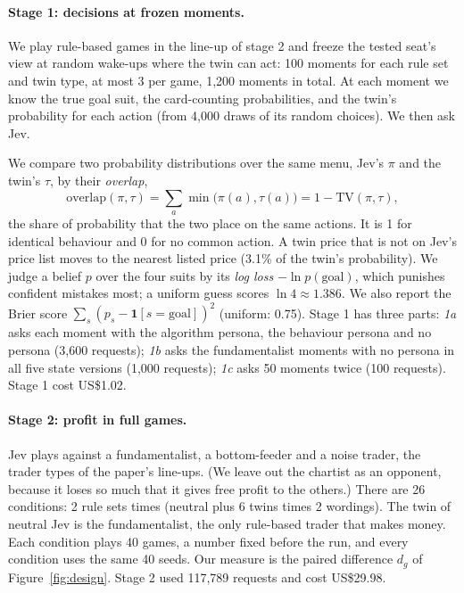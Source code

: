 \documentclass[10pt]{article}
\begin{document}
\paragraph{Stage 1: decisions at frozen moments.} We play rule-based games in the line-up of stage 2 and freeze the
tested seat's view at random wake-ups where the twin can act: 100 moments for each rule set and twin type, at most 3
per game, 1,200 moments in total. At each moment we know the true goal suit, the card-counting probabilities, and the
twin's probability for each action (from 4,000 draws of its random choices). We then ask Jev.

We compare two
probability distributions over the same menu, Jev's $\pi$ and the twin's $\tau$, by their \emph{overlap},
\[
  \mathrm{overlap}(\pi,\tau) = \sum_{a} \min\bigl(\pi(a), \tau(a)\bigr) = 1 - \mathrm{TV}(\pi,\tau),
\]
the share of probability that the two place on the same actions. It is 1 for identical behaviour and 0 for no common
action. A twin price that is not on Jev's price list moves to the nearest listed price (3.1\% of the twin's
probability). We judge a belief $p$ over the four suits by its \emph{log loss} $-\ln p(\text{goal})$, which punishes
confident mistakes most; a uniform guess scores $\ln 4 \approx 1.386$. We also report the Brier score
$\sum_s (p_s - \mathbf{1}[s = \text{goal}])^2$ (uniform: 0.75). Stage 1 has three parts: \emph{1a} asks each moment
with the algorithm persona, the behaviour persona and no persona (3,600 requests); \emph{1b} asks the fundamentalist
moments with no persona in all five state versions (1,000 requests); \emph{1c} asks 50 moments twice (100 requests).
Stage 1 cost US\$1.02.

\paragraph{Stage 2: profit in full games.} Jev plays against a fundamentalist, a bottom-feeder and a noise trader,
the trader types of the paper's line-ups. (We leave out the chartist as an opponent, because it loses so much that it
gives free profit to the others.) There are 26 conditions: 2 rule sets times (neutral plus 6 twins times 2 wordings).
The twin of neutral Jev is the fundamentalist, the only rule-based trader that makes money. Each condition plays 40
games, a number fixed before the run, and every condition uses the same 40 seeds. Our measure is the paired difference
$d_g$ of Figure~\ref{fig:design}. Stage 2 used 117,789 requests and cost US\$29.98.
\end{document}
